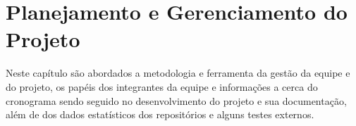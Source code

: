 \chapter{Planejamento e Gerenciamento do Projeto}
Neste capítulo são abordados a metodologia e ferramenta da gestão da equipe e do projeto, os papéis dos integrantes da equipe e informações a cerca do cronograma sendo seguido no desenvolvimento do projeto e sua documentação, além de dos dados estatísticos dos repositórios e alguns testes externos.



